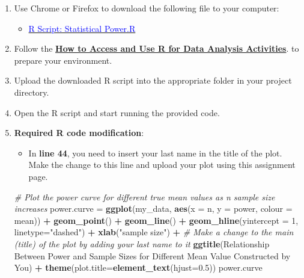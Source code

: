 \documentclass[oneside,openany]{book}
\newenvironment{Shaded}{\begin{snugshade}}{\end{snugshade}}
\newcommand{\AttributeTok}[1]{\textcolor[rgb]{0.13,0.29,0.53}{#1}}
\newcommand{\CommentTok}[1]{\textcolor[rgb]{0.56,0.35,0.01}{\textit{#1}}}
\newcommand{\DecValTok}[1]{\textcolor[rgb]{0.00,0.00,0.81}{#1}}
\newcommand{\FloatTok}[1]{\textcolor[rgb]{0.00,0.00,0.81}{#1}}
\newcommand{\FunctionTok}[1]{\textcolor[rgb]{0.13,0.29,0.53}{\textbf{#1}}}
\newcommand{\NormalTok}[1]{#1}
\newcommand{\OtherTok}[1]{\textcolor[rgb]{0.56,0.35,0.01}{#1}}
\newcommand{\SpecialCharTok}[1]{\textcolor[rgb]{0.81,0.36,0.00}{\textbf{#1}}}
\newcommand{\StringTok}[1]{\textcolor[rgb]{0.31,0.60,0.02}{#1}}
\providecommand{\tightlist}{%
  \setlength{\itemsep}{0pt}\setlength{\parskip}{0pt}}
\begin{document}
\begin{enumerate}
\def\labelenumi{\arabic{enumi}.}
\tightlist
\item
  Use Chrome or Firefox to download the following file to your computer:

  \begin{itemize}
  \tightlist
  \item
    \href{https://raw.githubusercontent.com/aslemand/Data-Analysis-Activities/main/data/Activity_7/Statistical_Power.R}{\textcolor{blue}{R Script: Statistical Power.R}}
  \end{itemize}
\item
  Follow the \hyperref[how-to-set-up-r-for-data-analysis-activities]{\textbf{How to Access and Use R for Data Analysis Activities}}. to prepare your environment.
\item
  Upload the downloaded R script into the appropriate folder in your project directory.
\item
  Open the R script and start running the provided code.
\item
  \textbf{Required R code modification}:

  \begin{itemize}
  \tightlist
  \item
    In \textbf{line 44}, you need to insert your last name in the title of the plot. Make the change to this line and upload your plot using this assignment page.
  \end{itemize}

\begin{Shaded}
\begin{Highlighting}[]
\CommentTok{\# Plot the power curve for different true mean values as n sample size increases}
\NormalTok{power.curve }\OtherTok{=} \FunctionTok{ggplot}\NormalTok{(my\_data, }\FunctionTok{aes}\NormalTok{(}\AttributeTok{x =}\NormalTok{ n, }\AttributeTok{y =}\NormalTok{ power, }\AttributeTok{colour =}\NormalTok{ mean)) }\SpecialCharTok{+}
  \FunctionTok{geom\_point}\NormalTok{() }\SpecialCharTok{+} \FunctionTok{geom\_line}\NormalTok{() }\SpecialCharTok{+}
  \FunctionTok{geom\_hline}\NormalTok{(}\AttributeTok{yintercept =} \DecValTok{1}\NormalTok{, }\AttributeTok{linetype=}\StringTok{"dashed"}\NormalTok{) }\SpecialCharTok{+} 
  \FunctionTok{xlab}\NormalTok{(}\StringTok{"sample size"}\NormalTok{) }\SpecialCharTok{+}
  \CommentTok{\# Make a change to the main (title) of the plot by adding your last name to it}
  \FunctionTok{ggtitle}\NormalTok{(}\StringTok{\textquotesingle{}Relationship Between Power and Sample Sizes for Different Mean Value}
  \StringTok{Constructed by You\textquotesingle{}}\NormalTok{) }\SpecialCharTok{+}
  \FunctionTok{theme}\NormalTok{(}\AttributeTok{plot.title=}\FunctionTok{element\_text}\NormalTok{(}\AttributeTok{hjust=}\FloatTok{0.5}\NormalTok{))}
\NormalTok{power.curve}
\end{Highlighting}
\end{Shaded}
\end{enumerate}
\end{document}
